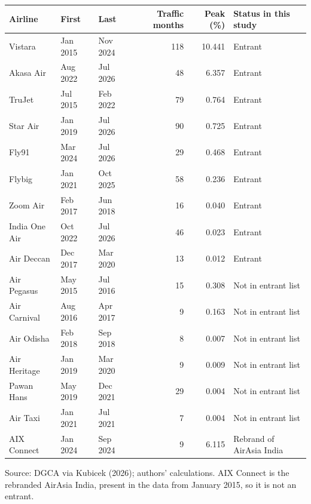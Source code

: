\documentclass[12pt,a4paper]{article}
\newenvironment{o3box}{\ifthenelse{\boolean{o3highlight}}{\begingroup\color{o3sky}}{}}{\ifthenelse{\boolean{o3highlight}}{\endgroup}{}}
\begin{document}
\begin{o3box}



\begingroup
\footnotesize
{}
\label{tab:o3-all}
\noindent\begin{tabularx}{\textwidth}{|X|l|l|r|r|l|}
\hline
\textbf{Airline} & \textbf{First} & \textbf{Last} & \textbf{Traffic months} & \textbf{Peak (\%)} & \textbf{Status in this study} \\
\hline
Vistara & Jan 2015 & Nov 2024 & 118 & 10.441 & Entrant \\
\hline
Akasa Air & Aug 2022 & Jul 2026 & 48 & 6.357 & Entrant \\
\hline
TruJet & Jul 2015 & Feb 2022 & 79 & 0.764 & Entrant \\
\hline
Star Air & Jan 2019 & Jul 2026 & 90 & 0.725 & Entrant \\
\hline
Fly91 & Mar 2024 & Jul 2026 & 29 & 0.468 & Entrant \\
\hline
Flybig & Jan 2021 & Oct 2025 & 58 & 0.236 & Entrant \\
\hline
Zoom Air & Feb 2017 & Jun 2018 & 16 & 0.040 & Entrant \\
\hline
India One Air & Oct 2022 & Jul 2026 & 46 & 0.023 & Entrant \\
\hline
Air Deccan & Dec 2017 & Mar 2020 & 13 & 0.012 & Entrant \\
\hline
Air Pegasus & May 2015 & Jul 2016 & 15 & 0.308 & Not in entrant list \\
\hline
Air Carnival & Aug 2016 & Apr 2017 & 9 & 0.163 & Not in entrant list \\
\hline
Air Odisha & Feb 2018 & Sep 2018 & 8 & 0.007 & Not in entrant list \\
\hline
Air Heritage & Jan 2019 & Mar 2020 & 9 & 0.009 & Not in entrant list \\
\hline
Pawan Hans & May 2019 & Dec 2021 & 29 & 0.004 & Not in entrant list \\
\hline
Air Taxi & Jan 2021 & Jul 2021 & 7 & 0.004 & Not in entrant list \\
\hline
AIX Connect & Jan 2024 & Sep 2024 & 9 & 6.115 & Rebrand of AirAsia India \\
\hline
\end{tabularx}
\par\footnotesize Source: DGCA via Kubicek (2026); authors' calculations. AIX Connect is the rebranded AirAsia India, present in the data from January 2015, so it is not an entrant.
\endgroup


\end{o3box}
\end{document}
